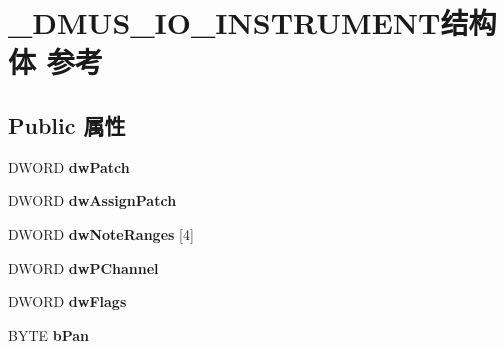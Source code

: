 \hypertarget{struct___d_m_u_s___i_o___i_n_s_t_r_u_m_e_n_t}{}\section{\+\_\+\+D\+M\+U\+S\+\_\+\+I\+O\+\_\+\+I\+N\+S\+T\+R\+U\+M\+E\+N\+T结构体 参考}
\label{struct___d_m_u_s___i_o___i_n_s_t_r_u_m_e_n_t}
\subsection*{Public 属性}
\begin{DoxyCompactItemize}
\item 
\mbox{\label{struct___d_m_u_s___i_o___i_n_s_t_r_u_m_e_n_t_a7192298bceff79acc8964e0874f6bdf0}} 
D\+W\+O\+RD {\bfseries dw\+Patch}
\item 
\mbox{\label{struct___d_m_u_s___i_o___i_n_s_t_r_u_m_e_n_t_acadbb31905c2334b9677ebb5580b6c32}} 
D\+W\+O\+RD {\bfseries dw\+Assign\+Patch}
\item 
\mbox{\label{struct___d_m_u_s___i_o___i_n_s_t_r_u_m_e_n_t_a1e0d642a29ff157feccb47f29ea84635}} 
D\+W\+O\+RD {\bfseries dw\+Note\+Ranges} \mbox{[}4\mbox{]}
\item 
\mbox{\label{struct___d_m_u_s___i_o___i_n_s_t_r_u_m_e_n_t_aaf02447cfd56f67606769c2e5801ef15}} 
D\+W\+O\+RD {\bfseries dw\+P\+Channel}
\item 
\mbox{\label{struct___d_m_u_s___i_o___i_n_s_t_r_u_m_e_n_t_adf0d7a38c1d966acdd7f67b98d5dae37}} 
D\+W\+O\+RD {\bfseries dw\+Flags}
\item 
\mbox{\label{struct___d_m_u_s___i_o___i_n_s_t_r_u_m_e_n_t_ac07cf6477ecbfcdeac752839094460cd}} 
B\+Y\+TE {\bfseries b\+Pan}
\item 
\mbox{\label{struct___d_m_u_s___i_o___i_n_s_t_r_u_m_e_n_t_acfeb7ca9251f7bc6575198051348f510}} 

\end{DoxyCompactItemize}
